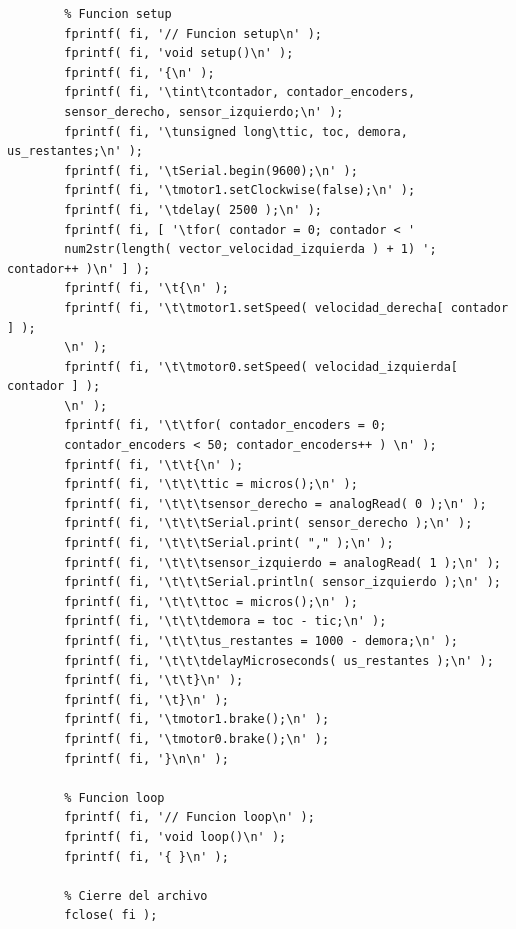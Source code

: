 \documentclass[12pt,a4paper]{article}
\begin{document}
\begin{verbatim}
        % Funcion setup
        fprintf( fi, '// Funcion setup\n' );
        fprintf( fi, 'void setup()\n' );
        fprintf( fi, '{\n' );
        fprintf( fi, '\tint\tcontador, contador_encoders,
        sensor_derecho, sensor_izquierdo;\n' );
        fprintf( fi, '\tunsigned long\ttic, toc, demora, us_restantes;\n' );
        fprintf( fi, '\tSerial.begin(9600);\n' );
        fprintf( fi, '\tmotor1.setClockwise(false);\n' );
        fprintf( fi, '\tdelay( 2500 );\n' );
        fprintf( fi, [ '\tfor( contador = 0; contador < '
        num2str(length( vector_velocidad_izquierda ) + 1) '; contador++ )\n' ] );
        fprintf( fi, '\t{\n' );
        fprintf( fi, '\t\tmotor1.setSpeed( velocidad_derecha[ contador ] );
        \n' );
        fprintf( fi, '\t\tmotor0.setSpeed( velocidad_izquierda[ contador ] );
        \n' );
        fprintf( fi, '\t\tfor( contador_encoders = 0;
        contador_encoders < 50; contador_encoders++ ) \n' );
        fprintf( fi, '\t\t{\n' );
        fprintf( fi, '\t\t\ttic = micros();\n' );
        fprintf( fi, '\t\t\tsensor_derecho = analogRead( 0 );\n' );
        fprintf( fi, '\t\t\tSerial.print( sensor_derecho );\n' );
        fprintf( fi, '\t\t\tSerial.print( "," );\n' );
        fprintf( fi, '\t\t\tsensor_izquierdo = analogRead( 1 );\n' );
        fprintf( fi, '\t\t\tSerial.println( sensor_izquierdo );\n' );
        fprintf( fi, '\t\t\ttoc = micros();\n' );
        fprintf( fi, '\t\t\tdemora = toc - tic;\n' );
        fprintf( fi, '\t\t\tus_restantes = 1000 - demora;\n' );
        fprintf( fi, '\t\t\tdelayMicroseconds( us_restantes );\n' );
        fprintf( fi, '\t\t}\n' );
        fprintf( fi, '\t}\n' );
        fprintf( fi, '\tmotor1.brake();\n' );
        fprintf( fi, '\tmotor0.brake();\n' );
        fprintf( fi, '}\n\n' );

        % Funcion loop
        fprintf( fi, '// Funcion loop\n' );
        fprintf( fi, 'void loop()\n' );
        fprintf( fi, '{ }\n' );

        % Cierre del archivo
        fclose( fi );
		\end{verbatim}
    
\end{document}
